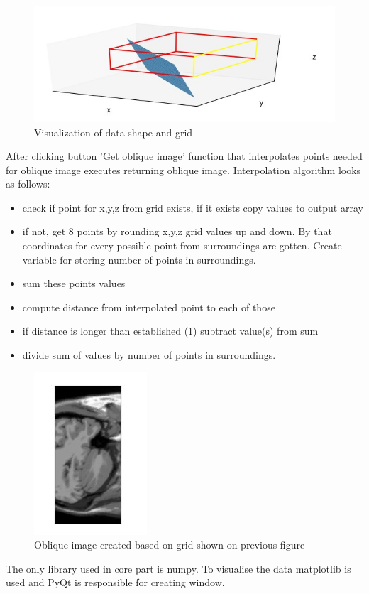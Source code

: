 \begin{figure}[H]
\centering{}\includegraphics[scale=0.7]{figures/module_12/mod12vis}\caption{Visualization of data shape and grid \label{fig:figures/module_12/mod12vis}}
\end{figure}
\indent After clicking button 'Get oblique image' function that interpolates points needed for oblique image executes returning oblique image. 
\newline\indent Interpolation algorithm looks as follows:
\begin{itemize}
\item check if point for x,y,z from grid exists, if it exists copy values to output array
\item if not, get 8 points by rounding x,y,z grid values up and down. By that coordinates for every possible point from surroundings are gotten. Create variable for storing number of points in surroundings.
\item sum these points values
\item compute distance from interpolated point to each of those
\item if distance is longer than established (1) subtract value(s) from sum
\item divide sum of values by number of points in surroundings.
\end{itemize}
\begin{figure}[H]
\centering{}\includegraphics[scale=0.7]{figures/module_12/mod12oblim}\caption{Oblique image created based on grid shown on previous figure \label{fig:figures/module_12/mod12vis}}
\end{figure}

\indent The only library used in core part is numpy. To visualise the data matplotlib is used and PyQt is responsible for creating window.